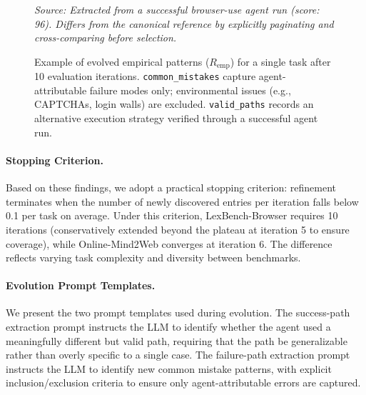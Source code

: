 \begin{figure}[h]
\begin{tcolorbox}[colback=gray!5, colframe=gray!50, title={\textbf{Example}: Empirical Patterns for Task ``Find the highest-rated braised pork belly recipe''}]
\vspace{2pt}
{\small\itshape Source: Extracted from a successful browser-use agent run (score: 96). Differs from the canonical reference by explicitly paginating and cross-comparing before selection.}

\end{tcolorbox}
\caption{Example of evolved empirical patterns ($R_{\text{emp}}$) for a single task after 10 evaluation iterations. \texttt{common\_mistakes} capture agent-attributable failure modes only; environmental issues (e.g., CAPTCHAs, login walls) are excluded. \texttt{valid\_paths} records an alternative execution strategy verified through a successful agent run.}
\label{fig:r_emp_example}
\end{figure}

\paragraph{Stopping Criterion.} Based on these findings, we adopt a practical stopping criterion: refinement terminates when the number of newly discovered entries per iteration falls below 0.1 per task on average. Under this criterion, LexBench-Browser requires 10 iterations (conservatively extended beyond the plateau at iteration 5 to ensure coverage), while Online-Mind2Web converges at iteration 6. The difference reflects varying task complexity and diversity between benchmarks.

\paragraph{Evolution Prompt Templates.} We present the two prompt templates used during evolution. The success-path extraction prompt instructs the LLM to identify whether the agent used a meaningfully different but valid path, requiring that the path be generalizable rather than overly specific to a single case. The failure-path extraction prompt instructs the LLM to identify new common mistake patterns, with explicit inclusion/exclusion criteria to ensure only agent-attributable errors are captured.

